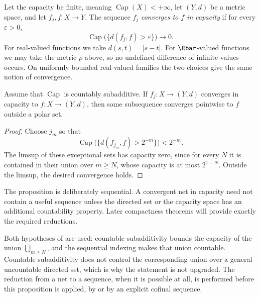 \begin{definition}
\label{def:capacity-convergence}
Let the capacity be finite, meaning $\operatorname{Cap}(X)<+\infty$, let
$(Y,d)$ be a metric space, and let
$f_j,f:X\to Y$.  The sequence $f_j$ \emph{converges to $f$ in capacity} if
for every $\varepsilon>0$,
\[
 \operatorname{Cap}\bigl(\{d(f_j,f)>\varepsilon\}\bigr)\longrightarrow0.
\]
For real-valued functions we take $d(s,t)=|s-t|$.  For $\Rbar$-valued
functions we may take the metric $\rho$ above, so no undefined difference of
infinite values occurs.  On uniformly bounded real-valued families the two
choices give the same notion of convergence.
\end{definition}

\begin{proposition}\label{prop:capacity-subsequence}
Assume that $\operatorname{Cap}$ is countably subadditive.  If
$f_j:X\to(Y,d)$ converges in capacity to $f:X\to(Y,d)$, then some
subsequence converges pointwise to $f$ outside a polar set.
\end{proposition}

\begin{proof}
Choose $j_m$ so that
\[
 \operatorname{Cap}\bigl(\{d(f_{j_m},f)>2^{-m}\}\bigr)<2^{-m}.
\]
The limsup of these exceptional sets has capacity zero, since for every $N$
it is contained in their union over $m\geq N$, whose capacity is at most
$2^{1-N}$.  Outside the limsup, the desired convergence holds.
\end{proof}

\begin{remark}
\label{rem:capacity-subsequence-sequential}
The proposition is deliberately sequential.  A convergent net in capacity
need not contain a useful sequence unless the directed set or the capacity
space has an additional countability property.  Later compactness theorems
will provide exactly the required reductions.
\end{remark}

Both hypotheses of  are used: countable
subadditivity bounds the capacity of the union $\bigcup_{m\geq N}$, and the
sequential indexing makes that union countable.  Countable subadditivity
does not control the corresponding union over a general uncountable
directed set, which is why the statement is not upgraded.  The reduction from a net to
a sequence, when it is possible at all, is performed before this proposition
is applied, by  or by an explicit cofinal
sequence.

